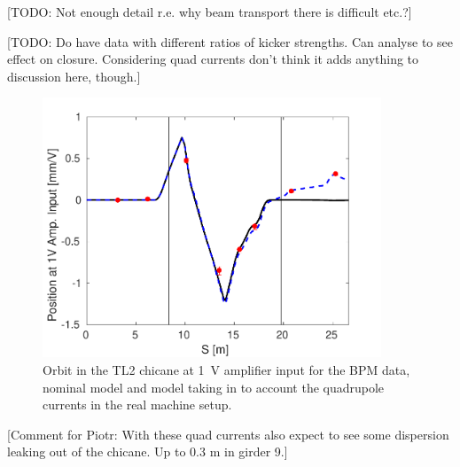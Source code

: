 [TODO: Not enough detail r.e. why beam transport there is difficult etc.?]

[TODO: Do have data with different ratios of kicker strengths. Can analyse to see effect on closure. Considering quad currents don't think it adds anything to discussion here, though.]

\begin{figure}
  \centering
  \includegraphics[width=0.9\textwidth]{Figures/commissioning/orbClosureVsQuadModel}
  \caption{Orbit in the TL2 chicane at 1~V amplifier input for the BPM data, nominal model and model taking in to account the quadrupole currents in the real machine setup.}
  \label{f:orbClosureVsQuadModel}
\end{figure}

[Comment for Piotr: With these quad currents also expect to see some dispersion leaking  out of the chicane. Up to 0.3 m in girder 9.]


